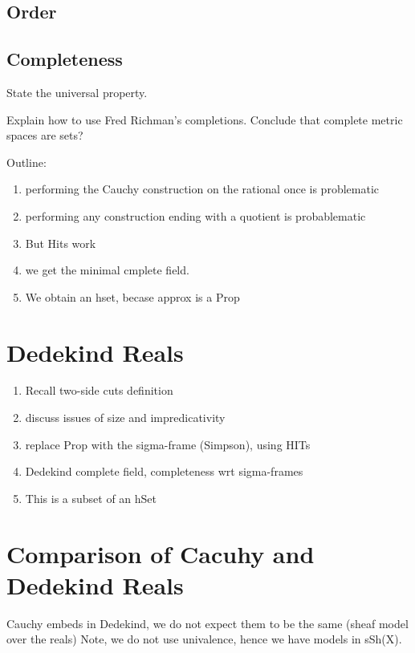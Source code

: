 \subsection{Order}
\label{sec:order}

\subsection{Completeness}
\label{sec:completeness}

State the universal property.

Explain how to use Fred Richman's completions. Conclude that complete metric spaces are sets?




\hrulefill

Outline:
\begin{enumerate}
  \item performing the Cauchy construction on the rational once is problematic
  \item performing any construction ending with a quotient is probablematic
  \item But Hits work
  \item we get the minimal cmplete field.
  \item We obtain an hset, becase approx is a Prop
\end{enumerate}

\section{Dedekind Reals}
\label{sec:dedekind-reals}

\begin{enumerate}
\item Recall two-side cuts definition
\item discuss issues of size and impredicativity
\item replace Prop with the sigma-frame (Simpson), using HITs
\item Dedekind complete field, completeness wrt sigma-frames
\item This is a subset of an hSet
\end{enumerate}

\section{Comparison of Cacuhy and Dedekind Reals}
\label{sec:comp-cacuhy-dedek}

Cauchy embeds in Dedekind, we do not expect them to be the same (sheaf model over the
reals) Note, we do not use univalence, hence we have models in sSh(X).

